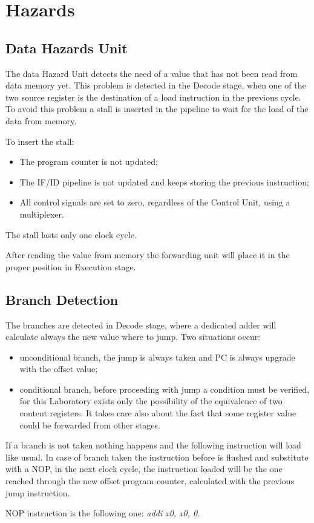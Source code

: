 %
\chapter{Hazards}
\label{cha4}

\section{Data Hazards Unit}

The data Hazard Unit detects the need of a value that has not been read from 
data memory yet. This problem is detected in the Decode stage, when one of the 
two source register is the destination of a load instruction in the previous cycle. 
To avoid this problem a stall is inserted in the pipeline to wait for the load of the data 
from memory. 

To insert the stall:
\begin{itemize}
    \item The program counter is not updated;
    \item The IF/ID pipeline is not updated and keeps storing the previous instruction;
    \item All control signals are set to zero, regardless of the Control Unit, using a multiplexer.
\end{itemize}
The stall lasts only one clock cycle.

After reading the value from memory the forwarding unit will place it in the proper 
position in Execution stage.

\section{Branch Detection}

The branches are detected in Decode stage, where a dedicated adder will calculate always the new value where to jump.
Two situations occur:
\begin{itemize}
    \item unconditional branch, the jump is always taken and PC is always upgrade with the offset value;
    \item conditional branch, before proceeding with jump a condition must be verified, for this Laboratory
     exists only the possibility of the equivalence of two content registers. It takes care also about the fact that
     some register value could be forwarded from other stages. 
\end{itemize}

If a branch is not taken nothing happens and the following instruction will load like usual. 
In case of branch taken the instruction before is flushed and substitute with a NOP, 
in the next clock cycle, the instruction loaded will be the 
one reached through the new offset program counter, calculated with the previous jump instruction.

NOP instruction is the following one: \textit{addi x0, x0, 0}.